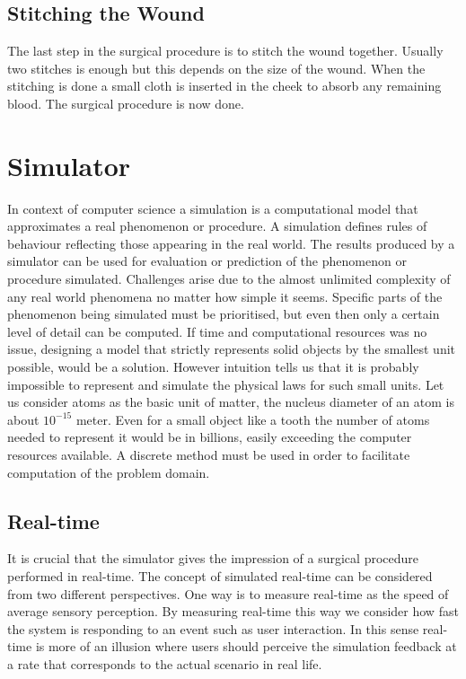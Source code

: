 \subsection*{Stitching the Wound}
The last step in the surgical procedure is to stitch the wound together. Usually two
stitches is enough but this depends on the size of the
wound. When the stitching is done a small cloth is inserted in the
cheek to absorb any remaining blood. The surgical procedure is now
done.

\section{Simulator}
\label{sec:simulator}
In context of computer science a simulation is a computational model
that approximates a real phenomenon or procedure. A simulation defines
rules of behaviour reflecting those appearing in the real world. The
results produced by a simulator can be used for evaluation or
prediction of the phenomenon or procedure simulated.  
%
Challenges arise due to the almost unlimited complexity of any real world
phenomena no matter how simple it seems.
Specific parts of the phenomenon being
simulated must be prioritised, but even then only a certain level of detail
can be computed. 
%
If time and computational resources was no issue, designing a
model that strictly represents solid objects by the smallest unit
possible, would be a solution. 
However intuition tells us that it is probably impossible to represent and 
simulate the physical laws for such small units. Let us consider atoms
as the basic unit of matter, the nucleus diameter of an atom is about $10^{-15}$
meter. Even for a small object like a tooth the number of atoms needed
to represent it would be in billions, easily exceeding the computer
resources available. A discrete method must be used in order to
facilitate computation of the problem domain. 


\subsection{Real-time}
\label{sec:real-time}
It is crucial that the simulator gives the impression of a surgical
procedure performed in real-time. 
The concept of simulated real-time can be considered from two
different perspectives. One way is to measure real-time as the speed
of average sensory perception. By measuring real-time this way we consider 
how fast the system is responding to an event such as user
interaction. In this sense real-time is more of an illusion where
users should perceive the simulation feedback at a rate that 
corresponds to the actual scenario in real life. 

